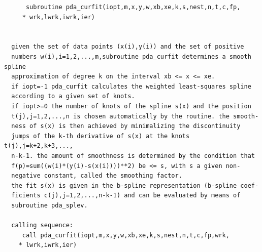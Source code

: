 \documentclass[11pt,twoside]{article}
\begin{document}
\begin{verbatim}
      subroutine pda_curfit(iopt,m,x,y,w,xb,xe,k,s,nest,n,t,c,fp,
     * wrk,lwrk,iwrk,ier)


  given the set of data points (x(i),y(i)) and the set of positive
  numbers w(i),i=1,2,...,m,subroutine pda_curfit determines a smooth spline
  approximation of degree k on the interval xb <= x <= xe.
  if iopt=-1 pda_curfit calculates the weighted least-squares spline
  according to a given set of knots.
  if iopt>=0 the number of knots of the spline s(x) and the position
  t(j),j=1,2,...,n is chosen automatically by the routine. the smooth-
  ness of s(x) is then achieved by minimalizing the discontinuity
  jumps of the k-th derivative of s(x) at the knots t(j),j=k+2,k+3,...,
  n-k-1. the amount of smoothness is determined by the condition that
  f(p)=sum((w(i)*(y(i)-s(x(i))))**2) be <= s, with s a given non-
  negative constant, called the smoothing factor.
  the fit s(x) is given in the b-spline representation (b-spline coef-
  ficients c(j),j=1,2,...,n-k-1) and can be evaluated by means of
  subroutine pda_splev.

  calling sequence:
     call pda_curfit(iopt,m,x,y,w,xb,xe,k,s,nest,n,t,c,fp,wrk,
    * lwrk,iwrk,ier)


\end{verbatim}
\end{document}
